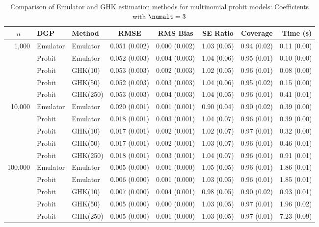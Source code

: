 \begin{table}[htbp]
\centering
\footnotesize
\begin{tabular}{@{}rllrrrrr@{}}
\toprule
\multicolumn{1}{c}{$n$} & \multicolumn{1}{l}{DGP} & \multicolumn{1}{l}{Method} & \multicolumn{1}{c}{RMSE} & \multicolumn{1}{c}{RMS Bias} & \multicolumn{1}{c}{SE Ratio} & \multicolumn{1}{c}{Coverage} & \multicolumn{1}{r}{Time (s)} \\
\midrule
\multirow{5}{*}{1,000} & Emulator & Emulator & 0.051 (0.002) & 0.000 (0.002) & 1.03 (0.05) & 0.94 (0.02) & 0.11 (0.00) \\
 & Probit & Emulator & 0.052 (0.003) & 0.004 (0.003) & 1.04 (0.06) & 0.95 (0.01) & 0.10 (0.00) \\
 & Probit & GHK(10) & 0.053 (0.003) & 0.002 (0.003) & 1.02 (0.05) & 0.96 (0.01) & 0.08 (0.00) \\
 & Probit & GHK(50) & 0.052 (0.003) & 0.003 (0.003) & 1.04 (0.06) & 0.95 (0.02) & 0.15 (0.00) \\
 & Probit & GHK(250) & 0.053 (0.003) & 0.004 (0.003) & 1.04 (0.05) & 0.96 (0.01) & 0.41 (0.01) \\
\midrule
\multirow{5}{*}{10,000} & Emulator & Emulator & 0.020 (0.001) & 0.001 (0.001) & 0.90 (0.04) & 0.90 (0.02) & 0.39 (0.00) \\
 & Probit & Emulator & 0.018 (0.001) & 0.003 (0.001) & 1.04 (0.07) & 0.96 (0.01) & 0.39 (0.00) \\
 & Probit & GHK(10) & 0.017 (0.001) & 0.002 (0.001) & 1.02 (0.07) & 0.97 (0.01) & 0.32 (0.00) \\
 & Probit & GHK(50) & 0.017 (0.001) & 0.002 (0.001) & 1.03 (0.07) & 0.96 (0.01) & 0.46 (0.01) \\
 & Probit & GHK(250) & 0.018 (0.001) & 0.003 (0.001) & 1.04 (0.07) & 0.96 (0.01) & 0.91 (0.01) \\
\midrule
\multirow{5}{*}{100,000} & Emulator & Emulator & 0.005 (0.000) & 0.001 (0.000) & 1.05 (0.05) & 0.96 (0.01) & 1.86 (0.01) \\
 & Probit & Emulator & 0.006 (0.000) & 0.001 (0.000) & 1.03 (0.05) & 0.96 (0.01) & 1.85 (0.01) \\
 & Probit & GHK(10) & 0.007 (0.000) & 0.004 (0.001) & 0.98 (0.05) & 0.90 (0.02) & 0.93 (0.01) \\
 & Probit & GHK(50) & 0.005 (0.000) & 0.000 (0.000) & 1.03 (0.05) & 0.97 (0.01) & 1.96 (0.02) \\
 & Probit & GHK(250) & 0.005 (0.000) & 0.001 (0.000) & 1.03 (0.05) & 0.97 (0.01) & 7.23 (0.09) \\
\bottomrule
\end{tabular}
\caption{Comparison of Emulator and GHK estimation methods for multinomial probit models: Coefficients with $\numalt=3$}
\label{tab:emulator_vs_ghk:3:beta}
\end{table}